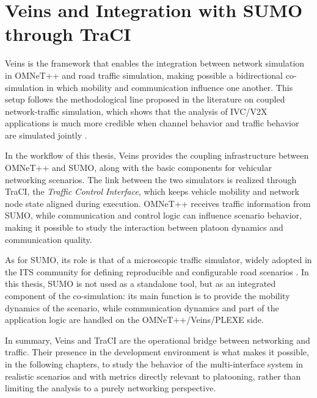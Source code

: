\section{Veins and Integration with SUMO through TraCI}
\label{env:veins}

Veins is the framework that enables the integration between network simulation in OMNeT++ and road traffic simulation, making possible a bidirectional co-simulation in which mobility and communication influence one another. This setup follows the methodological line proposed in the literature on coupled network-traffic simulation, which shows that the analysis of IVC/V2X applications is much more credible when channel behavior and traffic behavior are simulated jointly \cite{sommer2011bidirectionally,eckhoff2012multichannel}.

In the workflow of this thesis, Veins provides the coupling infrastructure between OMNeT++ and SUMO, along with the basic components for vehicular networking scenarios. The link between the two simulators is realized through TraCI, the \emph{Traffic Control Interface}, which keeps vehicle mobility and network node state aligned during execution. OMNeT++ receives traffic information from SUMO, while communication and control logic can influence scenario behavior, making it possible to study the interaction between platoon dynamics and communication quality.

As for SUMO, its role is that of a microscopic traffic simulator, widely adopted in the ITS community for defining reproducible and configurable road scenarios \cite{alvarez2018microscopic}. In this thesis, SUMO is not used as a standalone tool, but as an integrated component of the co-simulation: its main function is to provide the mobility dynamics of the scenario, while communication dynamics and part of the application logic are handled on the OMNeT++/Veins/PLEXE side.

In summary, Veins and TraCI are the operational bridge between networking and traffic. Their presence in the development environment is what makes it possible, in the following chapters, to study the behavior of the multi-interface system in realistic scenarios and with metrics directly relevant to platooning, rather than limiting the analysis to a purely networking perspective.
